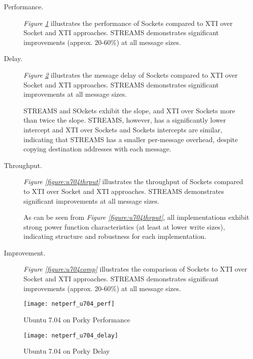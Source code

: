 \documentclass[letterpaper,final,notitlepage,twocolumn,10pt,twoside]{article}
\begin{document}
\begin{description}

\item[Performance.]

\textit{Figure \ref{figure:u704perf}}
illustrates the performance of Sockets compared to XTI over Socket and XTI
approaches.  STREAMS demonstrates significant improvements (approx. 20-60\%)
at all message sizes.

\item[Delay.]

\textit{Figure \ref{figure:u704dly}}
illustrates the message delay of Sockets compared to XTI over Socket and XTI
approaches.  STREAMS demonstrates significant improvements at all message
sizes.

STREAMS and SOckets exhibit the slope, and XTI over Sockets more than twice
the slope.  STREAMS, however, has a significantly lower intercept and XTI over
Sockets and Sockets intercepts are similar, indicating that STREAMS has a
smaller per-message overhead, despite copying destination addresses with each
message.

\item[Throughput.]

\textit{Figure \ref{figure:u704thrput}}
illustrates the throughput of Sockets compared to XTI over Socket and XTI
approaches.  STREAMS demonstrates significant improvements at all message
sizes.

As can be seen from \textit{Figure \ref{figure:u704thrput}}, all
implementations exhibit strong power function characteristics (at least at
lower write sizes), indicating structure and robustness for each
implementation.

\item[Improvement.]

\textit{Figure \ref{figure:u704comp}}
illustrates the comparison of Sockets to XTI over Socket and XTI approaches.
STREAMS demonstrates significant improvements (approx. 20-60\%) at all message
sizes.

\end{description}

\begin{figure}[p]
\center\texttt{[image: netperf\_u704\_perf]}
\caption[Ubuntu 7.04 on Porky Performance]{Ubuntu 7.04 on Porky Performance}
\label{figure:u704perf}
\end{figure}

\begin{figure}[p]
\center\texttt{[image: netperf\_u704\_delay]}
\caption[Ubuntu 7.04 on Porky Delay]{Ubuntu 7.04 on Porky Delay}
\label{figure:u704dly}
\end{figure}
\end{document}
